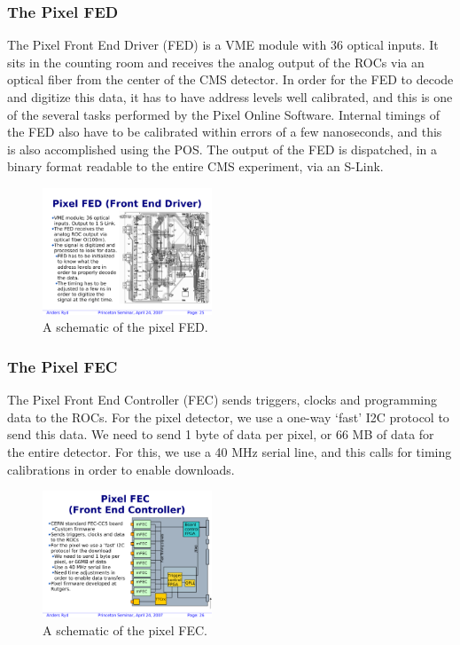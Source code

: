 \clearpage

\subsubsection{The Pixel FED}

The Pixel Front End Driver (FED) is a VME module
with 36 optical inputs. It sits in the counting room and receives the analog output
of the ROCs via an optical fiber from the center of the CMS detector.
In order for the FED to decode and digitize this data, it has to have address levels 
well calibrated, and this is one of the several tasks performed by the Pixel Online Software.
Internal timings of the FED also have to be calibrated within errors of a few nanoseconds,
and this is also accomplished using the POS. The output of the FED
is dispatched, in a binary format readable to the entire CMS experiment, via an S-Link.

\begin{figure}[h]
\begin{center}
 \includegraphics[width=0.45\textwidth]{pFED.pdf}
\end{center}
\caption{A schematic of the pixel FED.}
\label{fig:pFED}
\end{figure}

\clearpage

\subsubsection{The Pixel FEC}

The Pixel Front End Controller (FEC) sends triggers, clocks 
and programming data to the ROCs. For the pixel detector, 
we use a one-way `fast' I2C protocol to send this data.
We need to send 1 byte of data per pixel, or 66 MB of data
for the entire detector. For this, we use a 40 MHz serial line, 
and this calls for timing calibrations in order to enable downloads.

\begin{figure}[h]
\begin{center}
 \includegraphics[width=0.45\textwidth]{pFEC.pdf}
\end{center}
\caption{A schematic of the pixel FEC.}
\label{fig:pFEC}
\end{figure}

